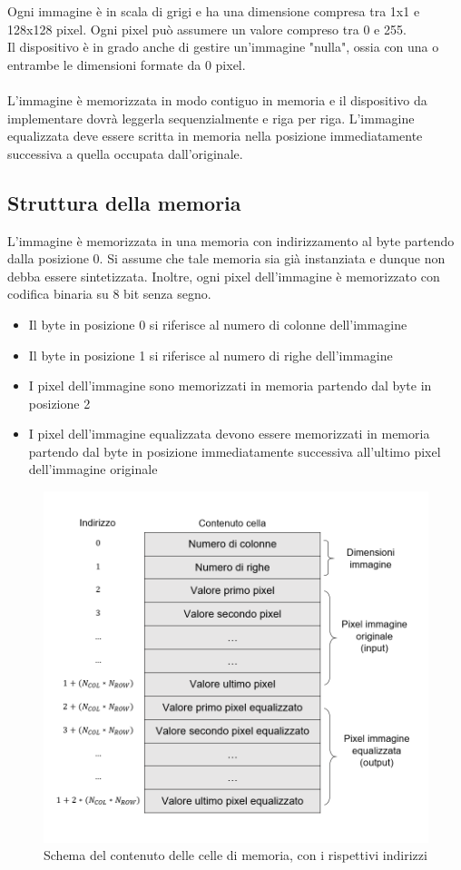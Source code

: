 \documentclass[a4paper, 12pt]{article}
\begin{document}
\bigskip
Ogni immagine è in scala di grigi e ha una dimensione compresa tra 1x1 e 128x128 pixel. Ogni pixel può assumere un valore compreso tra 0 e 255. \\
Il dispositivo è in grado anche di gestire un'immagine "nulla", ossia con una o entrambe le dimensioni formate da 0 pixel.
\\\\
L'immagine è memorizzata in modo contiguo in memoria e il dispositivo da implementare dovrà leggerla sequenzialmente e riga per riga. L'immagine equalizzata deve essere scritta in memoria nella posizione immediatamente successiva a quella occupata dall'originale.

\subsection{Struttura della memoria}
L'immagine è memorizzata in una memoria con indirizzamento al byte partendo dalla posizione 0.
Si assume che tale memoria sia già instanziata e dunque non debba essere sintetizzata.
Inoltre, ogni pixel dell'immagine è memorizzato con codifica binaria su 8 bit senza segno.
\bigskip
\begin{itemize}
    \item Il byte in posizione 0 si riferisce al numero di colonne dell'immagine
    \item Il byte in posizione 1 si riferisce al numero di righe dell'immagine
    \item I pixel dell'immagine sono memorizzati in memoria partendo dal byte in posizione 2
    \item I pixel dell'immagine equalizzata devono essere memorizzati in memoria partendo dal byte in posizione immediatamente successiva all'ultimo pixel dell'immagine originale
\end{itemize}

\begin{figure}[h]
    \centering
    \includegraphics[scale=0.90]{introduzione/memory_scheme.png}
    \caption{Schema del contenuto delle celle di memoria, con i rispettivi indirizzi}
    \label{fig:memory_scheme}
\end{figure}
\end{document}

